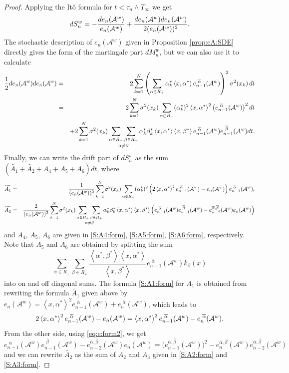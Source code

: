 \documentclass{article}
\numberwithin{equation}{section}
\newcommand{\Aa}{\mathcal{A}^{w}}
\newcommand{\xas}{\left<x,\alpha^*\right>}
\newcommand{\xbs}{\left<x,\beta^*\right>}
\newcommand{\aR}{\alpha\in R_+}
\newcommand{\bR}{\beta\in R_+}
\newcommand{\SaR}{\sum_{\alpha\in R_+}}
\newcommand{\SanbR}{\mathop{\sum_{\aR}\sum_{\bR}}_{\alpha\neq \beta}}
\newcommand{\abs}{\left<\alpha^*,\beta^*\right>}
\newcommand{\shift}{\,\,}
\newcommand{\eA}[1]{e_{#1}(\Aa)}
\newcommand{\eaA}[1]{e_{#1}^{\shift\overline{\alpha}}(\Aa)}
\newcommand{\ebA}[1]{e_{#1}^{\shift\overline{\beta}}(\Aa)}
\newcommand{\eabA}[1]{e_{#1}^{\overline{\alpha}, \overline{\beta}}(\Aa)}
\newcommand{\lifetime}{T_\infty}
\theoremstyle{plain}
\begin{document}
\begin{proof}
		Applying the It\^o formula for $t<\tau_n\wedge \lifetime
        $ we get
    \begin{equation*}
	dS_n^w = -\frac{d\eA{n}}{\eA{n}}+\dfrac{d\eA{n}d\eA{n}}{2(\eA{n})^2}\/.
    \end{equation*}
		The stochastic description of $\eA{n}$ given in Proposition \ref{prop:eA:SDE} directly gives the form of the martingale part $dM^w_n$, but we can also use it to calculate  
    \begin{eqnarray*}
	\frac12 d\eA{n}d\eA{n} &=& 2\sum_{k=1}^N\left(\sum_{\aR} \alpha_k^* \xas \eaA{n-1}\right)^2\sigma^2(x_k)\,dt\\
	   &=& 2\sum_{k=1}^N \sigma^2(x_k) \SaR (\alpha_k^*)^2 \xas^2 \big(\eaA{n-1}\big)^2\,dt\\
		 && + 2\sum_{k=1}^N \sigma^2(x_k)\SanbR \alpha_k^* \beta_k^* \xas\xbs \eaA{n-1}\ebA{n-1}dt\/.
    \end{eqnarray*} 
    Finally, we can write the drift part of $dS_n^w$ as the sum $(\widetilde{A_1}+\widetilde{A_2}+A_4+A_5+A_6)dt$, where
    \begin{eqnarray*}
        \widetilde{A_1} &=& \frac{1}{(\eA{n})^2}\sum_{k=1}^N \sigma^2(x_k)\SaR (\alpha_k^*)^2  \left(2\xas^2 \eaA{n-1}-\eA{n}\right)\eaA{n-1}\/,\\
	\widetilde{A_2} &=& \frac{2}{(\eA{n})^2}\sum_{k=1}^N \sigma^2(x_k)\SanbR \alpha_k^* \beta_k^* \xas\xbs \left(\eaA{n-1}\ebA{n-1} - \eabA{n-2}\eA{n} \right)
    \end{eqnarray*}
    and $A_4$, $A_5$, $A_6$ are given in \eqref{S:A4:form}, \eqref{S:A5:form}, \eqref{S:A6:form}, respectively. Note that $A_5$ and $A_6$ are obtained by splitting the sum 
		$$
			\sum_{\aR}\sum_{\bR} \frac{\abs\xas}{\xbs} \eaA{n-1}k_\beta(x)
		$$
		into on and off diagonal sums. The formula \eqref{S:A1:form} for $A_1$ is obtained from rewriting the formula $\widetilde{A_1}$ given above by $\eA{n} = \xas^2\eaA{n-1}+\eaA{n}$, which leads to 
    \begin{equation*}
        2\xas^2 \eaA{n-1}-\eA{n} = \xas^2\eaA{n-1}-\eaA{n}\/.
    \end{equation*}
    From the other side, using \eqref{eq:e:form2}, we get
    \begin{equation*}
        \eaA{n-1}\ebA{n-1} - \eabA{n-2}\eA{n} = \big(\eabA{n-1}\big)^2-\eabA{n}\eabA{n-2}
    \end{equation*}
    and we can rewrite $\widetilde{A_2}$ as the sum of $A_2$ and $A_3$ given in \eqref{S:A2:form} and \eqref{S:A3:form}.
\end{proof}
\end{document}
